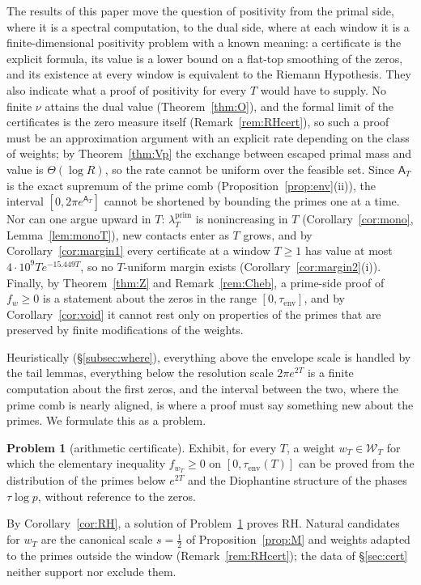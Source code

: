 \documentclass[11pt]{amsart}
\theoremstyle{definition}
\newtheorem{problem}[theorem]{Problem}
\theoremstyle{remark}
\newcommand{\lamP}{\lambda^{\mathrm{prim}}_T}
\newcommand{\Wcl}{\mathcal W_T}
\newcommand{\Aconst}{\mathsf A_T}
\begin{document}
The results of this paper move the question of positivity from the primal side, where it is a spectral
computation, to the dual side, where at each window it is a finite-dimensional positivity problem with a
known meaning: a certificate is the explicit formula, its value is a lower bound on a flat-top smoothing
of the zeros, and its existence at every window is equivalent to the Riemann Hypothesis. They also
indicate what a proof of positivity for every $T$ would have to supply. No finite $\nu$ attains the dual
value (Theorem~\ref{thm:O}), and the formal limit of the certificates is the zero measure itself
(Remark~\ref{rem:RHcert}), so such a proof must be an approximation argument with an explicit rate
depending on the class of weights; by Theorem~\ref{thm:Vp} the exchange between escaped primal mass and
value is $\Theta(\log R)$, so the rate cannot be uniform over the feasible set. Since $\Aconst$ is the exact
supremum of the prime comb (Proposition~\ref{prop:env}(ii)), the interval $[0,2\pi e^{\Aconst}]$ cannot be
shortened by bounding the primes one at a time. Nor can one argue upward in $T$: $\lamP$ is
nonincreasing in $T$ (Corollary~\ref{cor:mono}, Lemma~\ref{lem:monoT}), new contacts enter as $T$ grows, and
by Corollary~\ref{cor:margin1} every certificate at a window $T\ge1$ has value at most
$4\cdot10^9Te^{-15.449T}$, so no $T$-uniform margin exists (Corollary~\ref{cor:margin2}(i)). Finally, by
Theorem~\ref{thm:Z} and Remark~\ref{rem:Cheb}, a prime-side proof of $f_w\ge0$ is a statement about the zeros
in the range $[0,\tau_{\mathrm{env}}]$, and by Corollary~\ref{cor:void} it cannot rest only on properties of the
primes that are preserved by finite modifications of the weights.

Heuristically (\S\ref{subsec:where}), everything above the envelope scale is handled by the tail lemmas,
everything below the resolution scale $2\pi e^{2T}$ is a finite computation about the first zeros, and the
interval between the two, where the prime comb is nearly aligned, is where a proof must say something
new about the primes. We formulate this as a problem.

\begin{problem}[arithmetic certificate]\label{prob:B}
Exhibit, for every $T$, a weight $w_T\in\Wcl$ for which the elementary inequality
$f_{w_T}\ge0$ on $[0,\tau_{\mathrm{env}}(T)]$ can be proved from the distribution of the primes
below $e^{2T}$ and the Diophantine structure of the phases $\tau\log p$, without reference to
the zeros.
\end{problem}
By Corollary~\ref{cor:RH}, a solution of Problem~\ref{prob:B} proves RH. Natural candidates for $w_T$ are the
canonical scale $s=\frac12$ of Proposition~\ref{prop:M} and weights adapted to the primes outside the
window (Remark~\ref{rem:RHcert}); the data of \S\ref{sec:cert} neither support nor exclude them.
\end{document}
